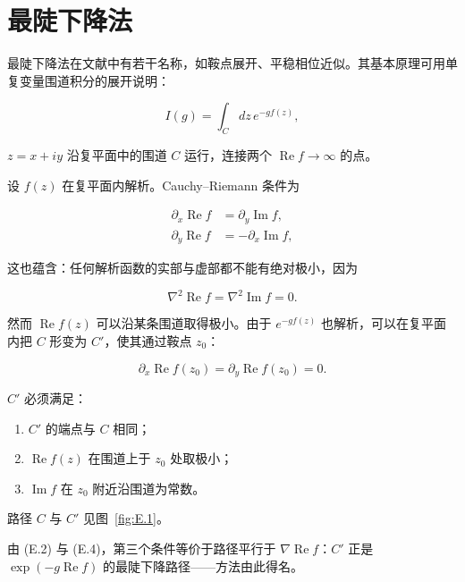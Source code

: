 \chapter{最陡下降法}

最陡下降法在文献中有若干名称，如鞍点展开、平稳相位近似。其基本原理可用单复变量围道积分的展开说明：

\begin{equation*}
I ( g ) = \int_ {C} d z \, e ^ {- g f ( z )} ,
\tag{E.1}
\end{equation*}

$z = x + iy$ 沿复平面中的围道 $C$ 运行，连接两个 $\operatorname{Re} f \to \infty$ 的点。

设 $f(z)$ 在复平面内解析。Cauchy--Riemann 条件为

\begin{align*}
\partial_ {x} \operatorname{Re} f & = \partial_ {y} \operatorname{Im} f ,\\
\partial_ {y} \operatorname{Re} f & = - \partial_ {x} \operatorname{Im} f ,
\tag{E.2}
\end{align*}

这也蕴含：任何解析函数的实部与虚部都不能有绝对极小，因为

\begin{equation*}
\nabla^ {2} \operatorname{Re} f = \nabla^ {2} \operatorname{Im} f = 0.
\tag{E.3}
\end{equation*}

然而 $\operatorname{Re}f(z)$ 可以沿某条围道取得极小。由于 $e^{-gf(z)}$ 也解析，可以在复平面内把 $C$ 形变为 $C'$，使其通过鞍点 $z_{0}$：

\begin{equation*}
\partial_ {x} \operatorname{Re} f \left( z _ {0} \right) = \partial_ {y} \operatorname{Re} f \left( z _ {0} \right) = 0.
\tag{E.4}
\end{equation*}

$C'$ 必须满足：

\begin{enumerate}[itemsep=1pt]
\item $C'$ 的端点与 $C$ 相同；
\item $\operatorname{Re}f(z)$ 在围道上于 $z_0$ 处取极小；
\item $\operatorname{Im}f$ 在 $z_{0}$ 附近沿围道为常数。
\end{enumerate}

路径 $C$ 与 $C'$ 见图~\ref{fig:E.1}。

由 (E.2) 与 (E.4)，第三个条件等价于路径平行于 $\nabla \operatorname{Re}f$：$C'$ 正是 $\exp(-g\operatorname{Re}f)$ 的最陡下降路径——方法由此得名。

